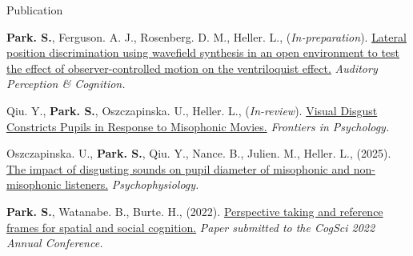 \documentclass{resume} %
\begin{document}

\begin{rSection}{Publication}
	\setlength{\hangingindent}{1.27cm}
	
	\begin{hangingpar}
		
		\textbf{Park. S.}, Ferguson. A. J., Rosenberg. D. M., Heller. L., (\textit{In-preparation}). \href{}{Lateral position discrimination using wavefield synthesis in an open environment to test the effect of observer-controlled motion on the ventriloquist effect.}
		\textit{Auditory Perception \& Cognition.}
		
	\end{hangingpar}
	
	\begin{hangingpar}
		
		Qiu. Y., \textbf{Park. S.}, Oszczapinska. U., Heller. L., (\textit{In-review}). \href{}{Visual Disgust Constricts Pupils in Response
			to Misophonic Movies.}
		\textit{Frontiers in Psychology.}
		
	\end{hangingpar}
	
	\begin{hangingpar}
		
		Oszczapinska. U., \textbf{Park. S.}, Qiu. Y., Nance. B., Julien. M., Heller. L., (2025). \href{https://doi.org/10.1111/psyp.70014}{The impact of disgusting sounds on pupil diameter of misophonic and non-misophonic listeners.}
		\textit{Psychophysiology.}
		
	\end{hangingpar}
	
	\begin{hangingpar}
		
		\textbf{Park. S.}, Watanabe. B., Burte. H., (2022). 
		\href{https://escholarship.org/uc/item/6wq5x6nn}{Perspective taking and reference frames for spatial and social cognition.} 
		\em{Paper submitted to the CogSci 2022 Annual Conference.}
		
	\end{hangingpar}
	
\end{rSection}
\end{document}
